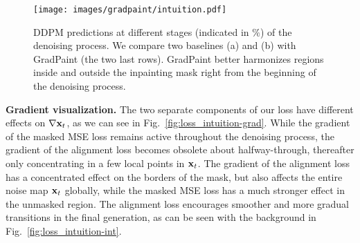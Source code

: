   

\begin{figure}[htbp]
  \centering
    \texttt{[image: images/gradpaint/intuition.pdf]}
    \caption{DDPM predictions at different stages (indicated in $\%$) of the denoising process. We compare two baselines (a) and (b) with GradPaint (the two last rows). GradPaint better harmonizes regions inside and outside the inpainting mask right from the beginning of the denoising process.}
    \label{fig:intuition}
\end{figure}

\noindent \textbf{Gradient visualization.} The two separate components of our loss have different effects on $\nabla{\mathbf{x}_t}$, as we can see in Fig.~\ref{fig:loss_intuition-grad}.  While the gradient of the masked MSE loss remains active throughout the denoising process, the gradient of the alignment loss becomes obsolete about halfway-through, thereafter only concentrating in a few local points in $\mathbf{x}_t$. The gradient of the alignment loss has a concentrated effect on the borders of the mask, but also affects the entire noise map $\mathbf{x}_t$ globally, while the masked MSE loss has a much stronger effect in the unmasked region. The alignment loss encourages smoother and more gradual transitions in the final generation, as can be seen with the background in Fig.~\ref{fig:loss_intuition-int}. 




